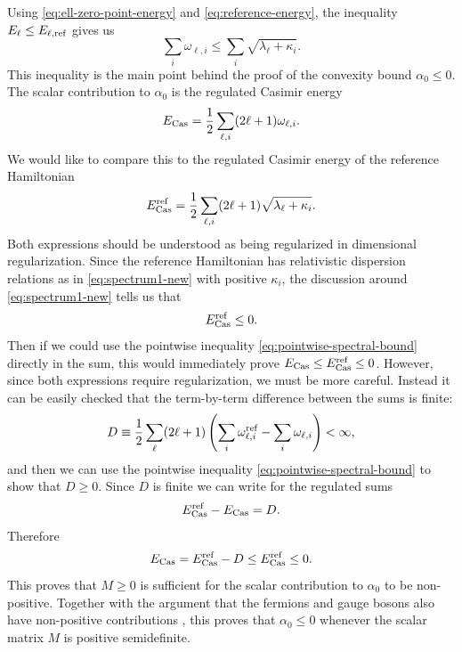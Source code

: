 \documentclass[a4paper,11pt]{article}
\begin{document}
Using \eqref{eq:ell-zero-point-energy} and \eqref{eq:reference-energy}, the inequality $E_\ell\leq E_{\ell,{\rm ref}}$ gives us
\begin{equation}\label{eq:pointwise-spectral-bound}
  \sum_i\omega_{\ell,i} \leq \sum_i \sqrt{\lambda_\ell+\kappa_i}.
\end{equation}
This inequality is the main point behind the proof of the convexity bound $\alpha_0\leq 0$. The scalar contribution to $\alpha_0$ is the regulated Casimir energy
\begin{equation}
  E_{\rm Cas}=\frac12\sum_{\ell,i}(2\ell+1) \omega_{\ell,i}.
\end{equation}
We would like to compare this to the regulated Casimir energy of the reference Hamiltonian 
\begin{equation}
  E_{\rm Cas}^{\rm ref}=\frac12\sum_{\ell,i} (2\ell+1)\sqrt{\lambda_\ell+\kappa_i}.
\end{equation}
Both expressions should be understood as being regularized in dimensional regularization. Since the reference Hamiltonian has relativistic dispersion relations as in \eqref{eq:spectrum1-new} with positive $\kappa_i$, the discussion around \eqref{eq:spectrum1-new} tells us that
\begin{equation}\label{eq:reference-casimir-negative}
  E_{\rm Cas}^{\rm ref}\leq0.
\end{equation}
Then if we could use the pointwise inequality \eqref{eq:pointwise-spectral-bound} directly in the sum, this would immediately prove $E_{\rm Cas}\leq E_{\rm Cas}^{\rm ref}\leq 0$. However, since both expressions require regularization, we must be more careful. Instead it can be easily checked that the term-by-term difference between the sums is finite:
\begin{equation}
  D\equiv \frac12\sum_{\ell}(2\ell+1)\left(\sum_i\omega_{\ell,i}^{\rm ref}-\sum_i\omega_{\ell,i}\right)<\infty,
\end{equation}
and then we can use the pointwise inequality \eqref{eq:pointwise-spectral-bound} to show that $D\geq 0$. Since $D$ is finite we can write for the regulated sums
\begin{equation}
  E_{\rm Cas}^{\rm ref}-E_{\rm Cas}=D.
\end{equation}
Therefore
\begin{equation}
  E_{\rm Cas} = E_{\rm Cas}^{\rm ref}-D \leq E_{\rm Cas}^{\rm ref} \leq0.
\end{equation}
This proves that $M\geq0$ is sufficient for the scalar contribution to $\alpha_0$ to be non-positive. Together with the argument that the fermions and gauge bosons also have non-positive contributions \cite{Cuomo:2024fuy}, this proves that $\alpha_0\leq 0$ whenever the scalar matrix $M$ is positive semidefinite.
\end{document}
